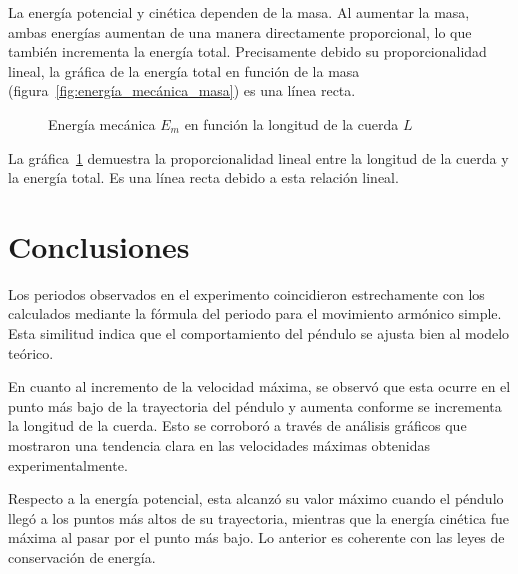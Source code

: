 \documentclass[letterpaper]{report}
\numberwithin{table}{section}
\begin{document}
La energía potencial y cinética dependen de la masa. Al aumentar la
masa, ambas energías aumentan de una manera directamente
proporcional, lo que también incrementa la energía total.
Precisamente debido su proporcionalidad lineal, la gráfica de la
energía total en función de la masa
(figura~\ref{fig:energía_mecánica_masa}) es una línea recta.

\begin{figure}[H]
  \centering
  \caption{Energía mecánica $E_{m}$ en función la longitud de la
  cuerda $L$}\label{fig:energía_mecánica_longitud_cuerda}
\end{figure}

La gráfica~\ref{fig:energía_mecánica_longitud_cuerda} demuestra la
proporcionalidad lineal entre la longitud de
la cuerda y la energía total. Es una línea recta debido a esta relación lineal.

\section{Conclusiones}

Los periodos observados en el experimento coincidieron estrechamente
con los calculados mediante la fórmula del periodo para el movimiento
armónico simple. Esta similitud indica que el comportamiento del
péndulo se ajusta bien al modelo teórico.

En cuanto al incremento de la velocidad máxima, se observó que esta
ocurre en el punto más bajo de la trayectoria del péndulo y aumenta
conforme se incrementa la longitud de la cuerda. Esto se corroboró a
través de análisis gráficos que mostraron una tendencia clara en las
velocidades máximas obtenidas experimentalmente.

Respecto a la energía potencial, esta alcanzó su valor máximo cuando
el péndulo llegó a los puntos más altos de su trayectoria, mientras
que la energía cinética fue máxima al pasar por el punto más bajo. Lo
anterior es coherente con las leyes de conservación de energía.
\end{document}
